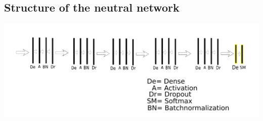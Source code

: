 \documentclass[a4paper,12pt]{article}
\begin{document}
\begin{landscape}
\begin{appendices}
\section{Structure of the neutral network}
\includegraphics[scale=1]{nn.pdf}
\end{appendices}
\end{landscape}

\nocite{*}
\printbibliography[title={Bibliography},heading=bibliography]
\end{document}
